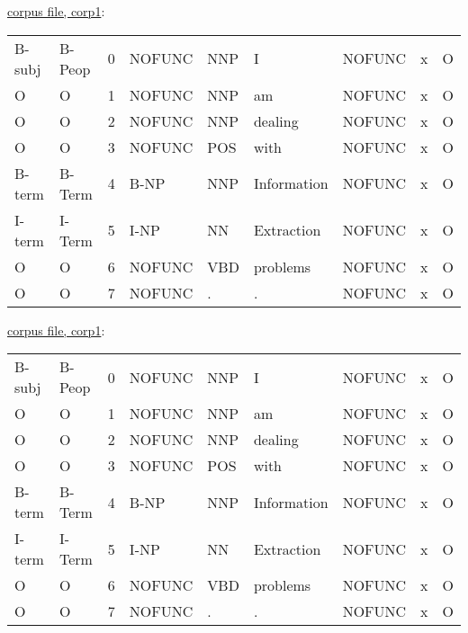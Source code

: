\documentclass[11pt]{article}
\begin{document}
\underline{corpus file, corp1}: 
\begin{center}
\begin{tabular}{@{}lllllllll}
B-subj   & B-Peop &  0  & NOFUNC & NNP & I            & NOFUNC  & x   & O \\
O        & O      &  1  & NOFUNC & NNP & am           & NOFUNC  & x   & O \\
O        & O      &  2  & NOFUNC & NNP & dealing      & NOFUNC  & x   & O \\
O        & O      &  3  & NOFUNC & POS & with         & NOFUNC  & x   & O \\ 
B-term   & B-Term &  4  & B-NP   & NNP & Information  & NOFUNC  & x   & O\\
I-term   & I-Term &  5  & I-NP   & NN  & Extraction   & NOFUNC  & x   & O\\
O        & O      &  6  & NOFUNC & VBD & problems     & NOFUNC  & x   & O\\
O        & O      &  7  & NOFUNC & .   &  .           & NOFUNC  & x   & O\\
\end{tabular} 
\end{center}
\underline{corpus file, corp1}: 
\begin{center}
\begin{tabular}{@{}lllllllll}
B-subj   & B-Peop &  0  & NOFUNC & NNP & I            & NOFUNC  & x   & O \\
O        & O      &  1  & NOFUNC & NNP & am           & NOFUNC  & x   & O \\
O        & O      &  2  & NOFUNC & NNP & dealing      & NOFUNC  & x   & O \\
O        & O      &  3  & NOFUNC & POS & with         & NOFUNC  & x   & O \\ 
B-term   & B-Term &  4  & B-NP   & NNP & Information  & NOFUNC  & x   & O\\
I-term   & I-Term &  5  & I-NP   & NN  & Extraction   & NOFUNC  & x   & O\\
O        & O      &  6  & NOFUNC & VBD & problems     & NOFUNC  & x   & O\\
O        & O      &  7  & NOFUNC & .   &  .           & NOFUNC  & x   & O\\
\end{tabular} 
\end{center}
\end{document}
